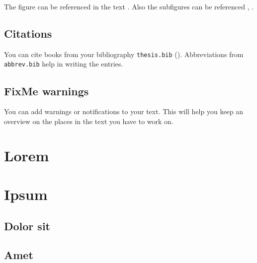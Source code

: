 The figure can be referenced in the text \eg{}.
Also the subfigures can be referenced \eg{}, .

\subsection{Citations} %
\label{sub:citations}
You can cite books from your bibliography \texttt{thesis.bib} (\eg \cite{cochrane}).
Abbreviations from \texttt{abbrev.bib} help in writing the entries.

\subsection{FixMe warnings}
\label{sub:fixme}
You can add warnings or notifications to your text.
This will help you keep an overview on the places in the text you have to work on.

\section{Lorem}
\label{sec:lorem}


\section{Ipsum}
\label{sec:ipsum}

\subsection{Dolor sit} %
\label{sub:dolor_sit}


\subsection{Amet} %
\label{sub:amet}






























